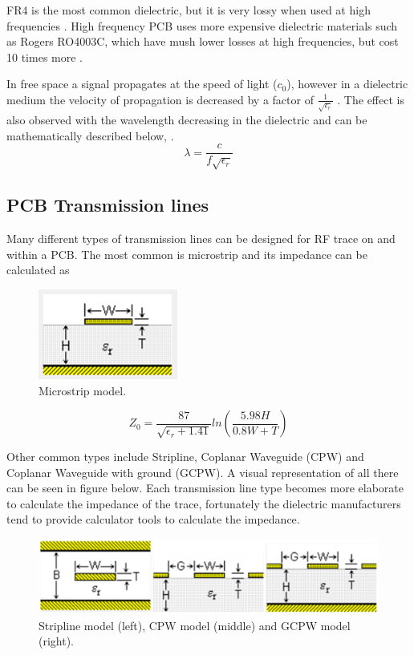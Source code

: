 FR4 is the most common dielectric, but it is very lossy when used at high frequencies \cite{FR4}. High frequency PCB uses more expensive dielectric materials such as Rogers RO4003C, which have mush lower losses at high frequencies, but cost 10 times more .

In free space a signal propagates at the speed of light (\(c_{0}\)), however in a dielectric medium the velocity of propagation is decreased by a factor of \(\frac{1}{\sqrt{\epsilon_{r}}}\) . The effect is also observed with the wavelength decreasing in the dielectric and can be mathematically described below, \cite{Wavelength}.
    \[\lambda=\frac{c}{f\sqrt{\epsilon_{r}}}\]

\subsection{PCB Transmission lines}
Many different types of transmission lines can be designed for RF trace on and within a PCB. The most common is microstrip and its impedance can be calculated as 

    \begin{figure}[H]
    \centering
    \includegraphics[width=0.25\linewidth]{Figures/chp2_microstrip.png}
    \caption{Microstrip model.}
    \label{fig:chp2_microstrip}
    \end{figure}
    \[Z_{0}=\frac{87}{\sqrt{\epsilon_{r}+1.41}}ln\left( \frac{5.98H}{0.8W+T} \right)\]

Other common types include Stripline, Coplanar Waveguide (CPW) and Coplanar Waveguide with ground (GCPW). A visual representation of all there can be seen in figure below. Each transmission line type becomes more elaborate to calculate the impedance of the trace, fortunately the dielectric manufacturers tend to provide calculator tools to calculate the impedance.

    \begin{figure}[H]
    \centering
    \includegraphics[width=0.65\linewidth]{Figures/chp2_transmission_lines.png}
    \caption{Stripline model (left), CPW model (middle) and GCPW model (right).}
    \label{fig:chp2_transmission_lines}
    \end{figure}

